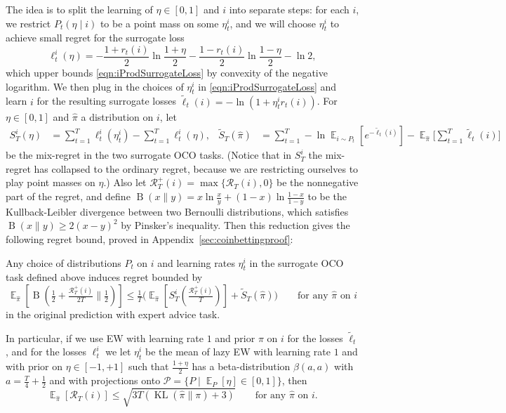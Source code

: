 \documentclass{colt2018} %
\DeclareMathOperator*{\E}{\mathbb{E}}
\DeclareMathOperator{\kl}{KL}
\DeclareMathOperator{\bernoullikl}{B}
\newcommand{\half}{\frac{1}{2}}
\newcommand{\thalf}{\tfrac{1}{2}}       %
\newcommand{\domainP}{\mathcal{P}}
\newcommand{\sloss}{\ell}                       %
\newcommand{\altsloss}{\tilde{\ell}}            %
\newcommand{\sregret}{S}                        %
\newcommand{\altsregret}{\tilde{S}}             %
\newcommand{\postpi}{\hat{\pi}}                 %
\newcommand{\regret}{\mathcal{R}}
\begin{document}
The idea is to split the learning of $\eta \in [0,1]$ and $i$ into
separate steps: for each $i$, we restrict $P_t(\eta \mid i)$ to be a
point mass on some $\eta_t^i$, and we will choose $\eta_t^i$ to achieve
small regret for the surrogate loss
% 
\[
  \sloss_t^i(\eta)
    = -\frac{1+r_t(i)}{2} \ln \frac{1+\eta}{2}
      -\frac{1-r_t(i)}{2} \ln \frac{1-\eta}{2}
      -\ln 2,
\]
% 
which upper bounds \eqref{eqn:iProdSurrogateLoss} by convexity of the
negative logarithm. We then plug in the choices of $\eta_t^i$ in
\eqref{eqn:iProdSurrogateLoss} and learn $i$ for the resulting surrogate
losses $\altsloss_t(i) = -\ln(1+\eta_t^i r_t(i))$.
% 
% 
% 
% 
% 
For $\eta \in [0,1]$ and $\postpi$ a distribution on $i$, let
% 
\begin{align*}
  \sregret_T^i(\eta)
    &= \sum_{t=1}^T \sloss_t^i(\eta_t^i) - 
       \sum_{t=1}^T \sloss_t^i(\eta),
  &\altsregret_T(\postpi)
    &= \sum_{t=1}^T -\ln \E_{i \sim P_t}\left[e^{-\altsloss_t(i)}\right]
      - \E_{\postpi}\Big[\sum_{t=1}^T \altsloss_t(i)\Big]
\end{align*}
% 
be the mix-regret in the two surrogate OCO tasks. (Notice that in
$\sregret_T^i$ the mix-regret has collapsed to the ordinary regret,
because we are restricting ourselves to play point masses on $\eta$.)
Also let $\regret_T^+(i) = \max\{\regret_T(i),0\}$ be the nonnegative
part of the regret, and define $\bernoullikl(x\|y) = x\ln \frac{x}{y} +
(1-x)\ln \frac{1-x}{1-y}$ to be the Kullback-Leibler divergence between
two Bernoulli distributions, which satisfies $\bernoullikl(x\|y) \geq
2(x-y)^2$ by Pinsker's inequality. Then this reduction gives the
following regret bound, proved in Appendix~\ref{sec:coinbettingproof}:
% 
\begin{theorem}\label{thm:coinbetting}
  Any choice of distributions $P_t$ on $i$ and learning rates $\eta_t^i$
  in the surrogate OCO task defined above induces regret bounded by
  \begin{equation}\label{eqn:coinbettinggeneral}
    \E_{\postpi}\left[\bernoullikl\left(\thalf + \tfrac{\regret_T^+(i)}{2T} \|
    \thalf\right)\right]
      \leq \tfrac{1}{T}
      \Big(\E_{\postpi}\left[\sregret_T^i\left(\tfrac{\regret_T^+(i)}{T}\right)\right] +
      \altsregret_T(\postpi)\Big)
    \qquad \text{for any $\postpi$ on $i$}
  \end{equation}
  in the original prediction with expert advice task.

  In particular, if we use EW with learning rate $1$ and prior $\pi$ on
  $i$ for the losses $\altsloss_t$, and for the losses $\sloss_t^i$ we
  let $\eta_t^i$ be the mean of lazy EW with learning rate $1$ and with
  prior on $\eta \in [-1,+1]$ such that $\frac{1+\eta}{2}$ has a
  beta-distribution $\beta(a,a)$ with $a=\frac{T}{4}+ \half$ and with
  projections onto $\domainP = \{P \mid \E_P[\eta] \in [0,1]\}$, then 
  \begin{equation}\label{eqn:coinbettingEW}
    \E_{\postpi}\left[\regret_T(i)\right]
      \leq 
      \sqrt{3T\left(\kl(\postpi\|\pi) + 3\right)}
    \qquad \text{for any $\postpi$ on $i$.}
  \end{equation}
\end{theorem}
\end{document}
